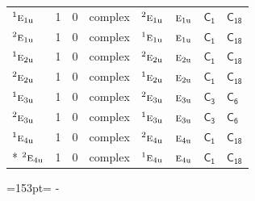 \documentclass[10pt,a4paper]{article}
\newcommand{\needspace}[1]{\par\penalty-100\begingroup\dimen0=#1\relax\dimen2=\pagegoal
  \advance\dimen2-\pagetotal\ifdim\dimen0>\dimen2\relax\ifdim\dimen2>0pt\vfil\break\fi\fi
  \endgroup}
\numberwithin{equation}{section}
\newcommand{\grp}[1]{\mathsf{#1}}
\newcommand{\irr}[1]{\text{\normalfont\scshape #1}}
\newcommand{\conjpair}[1]{{}^{#1}}
\newcommand{\ptag}[1]{\mathrm{#1}}
\begin{document}
{\begin{longtable}{@{}lrrlllll@{}}
$\conjpair{1}\irr{e}_{1\ptag{u}}$ & 1 & $0$ & complex & $\conjpair{2}\irr{e}_{1\ptag{u}}$ & $\irr{e}_{1\ptag{u}}$ & \href{C1.pdf}{$\grp{C_{1}}$} & $\grp{C_{18}}$\\
$\conjpair{2}\irr{e}_{1\ptag{u}}$ & 1 & $0$ & complex & $\conjpair{1}\irr{e}_{1\ptag{u}}$ & $\irr{e}_{1\ptag{u}}$ & \href{C1.pdf}{$\grp{C_{1}}$} & $\grp{C_{18}}$\\
$\conjpair{1}\irr{e}_{2\ptag{u}}$ & 1 & $0$ & complex & $\conjpair{2}\irr{e}_{2\ptag{u}}$ & $\irr{e}_{2\ptag{u}}$ & \href{C1.pdf}{$\grp{C_{1}}$} & $\grp{C_{18}}$\\
$\conjpair{2}\irr{e}_{2\ptag{u}}$ & 1 & $0$ & complex & $\conjpair{1}\irr{e}_{2\ptag{u}}$ & $\irr{e}_{2\ptag{u}}$ & \href{C1.pdf}{$\grp{C_{1}}$} & $\grp{C_{18}}$\\
$\conjpair{1}\irr{e}_{3\ptag{u}}$ & 1 & $0$ & complex & $\conjpair{2}\irr{e}_{3\ptag{u}}$ & $\irr{e}_{3\ptag{u}}$ & \href{C3.pdf}{$\grp{C_{3}}$} & \href{../../../rotation/data/pdf/C6.pdf}{$\grp{C_{6}}$}\\
$\conjpair{2}\irr{e}_{3\ptag{u}}$ & 1 & $0$ & complex & $\conjpair{1}\irr{e}_{3\ptag{u}}$ & $\irr{e}_{3\ptag{u}}$ & \href{C3.pdf}{$\grp{C_{3}}$} & \href{../../../rotation/data/pdf/C6.pdf}{$\grp{C_{6}}$}\\
$\conjpair{1}\irr{e}_{4\ptag{u}}$ & 1 & $0$ & complex & $\conjpair{2}\irr{e}_{4\ptag{u}}$ & $\irr{e}_{4\ptag{u}}$ & \href{C1.pdf}{$\grp{C_{1}}$} & $\grp{C_{18}}$\\*
$\conjpair{2}\irr{e}_{4\ptag{u}}$ & 1 & $0$ & complex & $\conjpair{1}\irr{e}_{4\ptag{u}}$ & $\irr{e}_{4\ptag{u}}$ & \href{C1.pdf}{$\grp{C_{1}}$} & $\grp{C_{18}}$\\
\bottomrule\end{longtable}}
\needspace{153pt}
\end{document}
